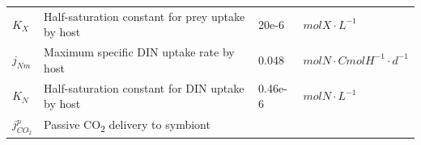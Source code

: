 \documentclass[]{elsarticle} %
\begin{document}
\begin{longtable}[c]{@{}llll@{}}
\begin{minipage}[t]{0.10\columnwidth}\raggedright\strut
\(K_X\)
\strut\end{minipage} &
\begin{minipage}[t]{0.48\columnwidth}\raggedright\strut
Half-saturation constant for prey uptake by host
\strut\end{minipage} &
\begin{minipage}[t]{0.09\columnwidth}\raggedright\strut
20e-6
\strut\end{minipage} &
\begin{minipage}[t]{0.23\columnwidth}\raggedright\strut
\(molX \cdot L^{-1}\)
\strut\end{minipage}\tabularnewline
\begin{minipage}[t]{0.10\columnwidth}\raggedright\strut
\(j_{Nm}\)
\strut\end{minipage} &
\begin{minipage}[t]{0.48\columnwidth}\raggedright\strut
Maximum specific DIN uptake rate by host
\strut\end{minipage} &
\begin{minipage}[t]{0.09\columnwidth}\raggedright\strut
0.048
\strut\end{minipage} &
\begin{minipage}[t]{0.23\columnwidth}\raggedright\strut
\(molN \cdot CmolH^{-1} \cdot d^{-1}\)
\strut\end{minipage}\tabularnewline
\begin{minipage}[t]{0.10\columnwidth}\raggedright\strut
\(K_N\)
\strut\end{minipage} &
\begin{minipage}[t]{0.48\columnwidth}\raggedright\strut
Half-saturation constant for DIN uptake by host
\strut\end{minipage} &
\begin{minipage}[t]{0.09\columnwidth}\raggedright\strut
0.46e-6
\strut\end{minipage} &
\begin{minipage}[t]{0.23\columnwidth}\raggedright\strut
\(molN \cdot L^{-1}\)
\strut\end{minipage}\tabularnewline
\begin{minipage}[t]{0.10\columnwidth}\raggedright\strut
\(j_{CO_2}^p\)
\strut\end{minipage} &
\begin{minipage}[t]{0.48\columnwidth}\raggedright\strut
Passive CO\textsubscript{2} delivery to symbiont
\strut\end{minipage} &
\begin{minipage}[t]{0.09\columnwidth}\raggedright\strut

\end{minipage}
\end{longtable}
\end{document}
